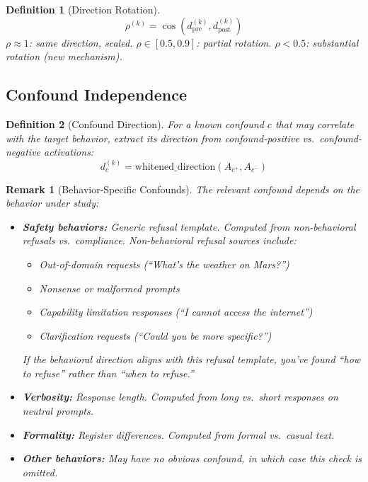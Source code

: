 \documentclass[11pt]{article}
\newtheorem{definition}{Definition}[section]
\newtheorem{remark}{Remark}[section]
\begin{document}
\begin{definition}[Direction Rotation]
\begin{equation}
\rho^{(k)} = \cos(d^{(k)}_{\text{pre}}, d^{(k)}_{\text{post}})
\end{equation}
$\rho \approx 1$: same direction, scaled. $\rho \in [0.5, 0.9]$: partial rotation. $\rho < 0.5$: substantial rotation (new mechanism).
\end{definition}

\subsection{Confound Independence}

\begin{definition}[Confound Direction]
For a known confound $c$ that may correlate with the target behavior, extract its direction from confound-positive vs.\ confound-negative activations:
\begin{equation}
d^{(k)}_c = \text{whitened\_direction}(A_{c^+}, A_{c^-})
\end{equation}
\end{definition}

\begin{remark}[Behavior-Specific Confounds]
The relevant confound depends on the behavior under study:
\begin{itemize}[nosep]
\item \textbf{Safety behaviors:} Generic refusal template. Computed from non-behavioral refusals vs.\ compliance. Non-behavioral refusal sources include:
\begin{itemize}[nosep]
\item Out-of-domain requests (``What's the weather on Mars?'')
\item Nonsense or malformed prompts
\item Capability limitation responses (``I cannot access the internet'')
\item Clarification requests (``Could you be more specific?'')
\end{itemize}
If the behavioral direction aligns with this refusal template, you've found ``how to refuse'' rather than ``when to refuse.''
\item \textbf{Verbosity:} Response length. Computed from long vs.\ short responses on neutral prompts.
\item \textbf{Formality:} Register differences. Computed from formal vs.\ casual text.
\item \textbf{Other behaviors:} May have no obvious confound, in which case this check is omitted.
\end{itemize}
\end{remark}
\end{document}
